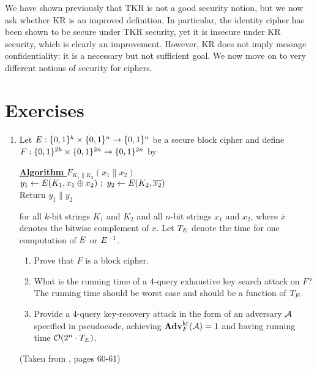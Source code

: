 We have shown previously that TKR is not a good security notion, but we now ask whether KR is an improved definition. In particular, the identity cipher has been shown to be secure under TKR security, yet it is insecure under KR security, which is clearly an improvement. However, KR does not imply message confidentiality: it is a necessary but not sufficient goal. We now move on to very different notions of security for ciphers.

\section*{Exercises}

\begin{enumerate}[label=\textbf{Exercise \thesection.\arabic*}, wide=0pt]
	\item Let $E : \{0,1\}^k \times \{0,1\}^n \to \{0,1\}^n$ be a secure block cipher and define $F : \{0,1\}^{2k} \times \{0,1\}^{2n} \to \{0,1\}^{2n}$ by
	\begin{center}
		\begin{minipage}{0.5\linewidth}
			\underline{\textbf{Algorithm} $F_{K_1 \| K_2}(x_1 \| x_2)$} \\
			$y_1 \gets \cipherE(K_1, x_1 \oplus x_2) \ ; \ y_2 \gets \cipherE(K_2, \overline{x_2})$ \\
			Return $y_1 \| y_2$
		\end{minipage}
	\end{center}
	for all $k$-bit strings $K_1$ and $K_2$ and all $n$-bit strings $x_1$ and $x_2$, where $\overline{x}$ denotes the bitwise complement of $x$. Let $T_E$ denote the time for one computation of $E$ or $E^{-1}$. 
	\begin{enumerate}
		\item Prove that $F$ is a block cipher.
		\item What is the running time of a 4-query exhaustive key search attack on $F$? The running time should be worst case and should be a function of $T_E$. 
		\item Provide a 4-query key-recovery attack in the form of an adversary ${\mathcal A}$ specified in pseudocode, achieving $\mathbf{Adv}^{\mathrm{kr}}_{F}({\mathcal A})=1$ and having running time ${\cal O}(2^n \cdot T_E)$. 
	\end{enumerate}
	(Taken from \cite{BellareBCNotes}, pages 60-61)
	
	

\end{enumerate}
